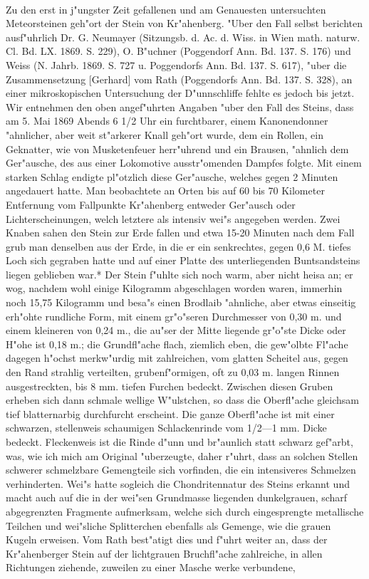 \documentclass[a4paper, 11pt, oneside]{article}
\begin{document}
\paragraph{}
Zu den erst in j"ungster Zeit gefallenen und am Genauesten untersuchten Meteorsteinen geh"ort der Stein von Kr"ahenberg. "Uber den Fall selbst berichten ausf"uhrlich Dr. G. Neumayer (Sitzungsb. d. Ac. d. Wiss. in Wien math. naturw. Cl. Bd. LX. 1869. S. 229), O. B"uchner (Poggendorf Ann. Bd. 137. S. 176) und Weiss (N. Jahrb. 1869. S. 727 u. Poggendorfs Ann. Bd. 137. S. 617), "uber die Zusammensetzung [Gerhard] vom Rath (Poggendorfs Ann. Bd. 137. S. 328), an einer mikroskopischen Untersuchung der D"unnschliffe fehlte es jedoch bis jetzt. Wir entnehmen den oben angef"uhrten Angaben "uber den Fall des Steins, dass am 5. Mai 1869 Abends 6 1/2 Uhr ein furchtbarer, einem Kanonendonner "ahnlicher, aber weit st"arkerer Knall geh"ort wurde, dem ein Rollen, ein Geknatter, wie von Musketenfeuer herr"uhrend und ein Brausen, "ahnlich dem Ger"ausche, des aus einer Lokomotive ausstr"omenden Dampfes folgte. Mit einem starken Schlag endigte pl"otzlich diese Ger"ausche, welches gegen 2 Minuten angedauert hatte. Man beobachtete an Orten bis auf 60 bis 70 Kilometer Entfernung vom Fallpunkte Kr"ahenberg entweder Ger"ausch oder Lichterscheinungen, welch letztere als intensiv wei"s angegeben werden. Zwei Knaben sahen den Stein zur Erde fallen und etwa 15-20 Minuten nach dem Fall grub man denselben aus der Erde, in die er ein senkrechtes, gegen 0,6 M. tiefes Loch sich gegraben hatte und auf einer Platte des unterliegenden Buntsandsteins liegen geblieben war.* Der Stein f"uhlte sich noch warm, aber nicht heisa an; er wog, nachdem wohl einige Kilogramm abgeschlagen worden waren, immerhin noch 15,75 Kilogramm und besa"s einen Brodlaib "ahnliche, aber etwas einseitig erh"ohte rundliche Form, mit einem gr"o"seren Durchmesser von 0,30 m. und einem kleineren von 0,24 m., die au"ser der Mitte liegende gr"o"ste Dicke oder H"ohe ist 0,18 m.; die Grundfl"ache flach, ziemlich eben, die gew"olbte Fl"ache dagegen h"ochst merkw"urdig mit zahlreichen, vom glatten Scheitel aus, gegen den Rand strahlig verteilten, grubenf"ormigen, oft zu 0,03 m. langen Rinnen ausgestreckten, bis 8 mm. tiefen Furchen bedeckt. Zwischen diesen Gruben erheben sich dann schmale wellige W"ulstchen, so dass die Oberfl"ache gleichsam tief blatternarbig durchfurcht erscheint. Die ganze Oberfl"ache ist mit einer schwarzen, stellenweis schaumigen Schlackenrinde vom 1/2---1 mm. Dicke bedeckt. Fleckenweis ist die Rinde d"unn und br"aunlich statt schwarz gef"arbt, was, wie ich mich am Original "uberzeugte, daher r"uhrt, dass an solchen Stellen schwerer schmelzbare Gemengteile sich vorfinden, die ein intensiveres Schmelzen verhinderten. Wei"s hatte sogleich die Chondritennatur des Steins erkannt und macht auch auf die in der wei"sen Grundmasse liegenden dunkelgrauen, scharf abgegrenzten Fragmente aufmerksam, welche sich durch eingesprengte metallische Teilchen und wei"sliche Splitterchen ebenfalls als Gemenge, wie die grauen Kugeln erweisen. Vom Rath best"atigt dies und f"uhrt weiter an, dass der Kr"ahenberger Stein auf der lichtgrauen Bruchfl"ache zahlreiche, in allen Richtungen ziehende, zuweilen zu einer Masche werke verbundene, 
\end{document}
